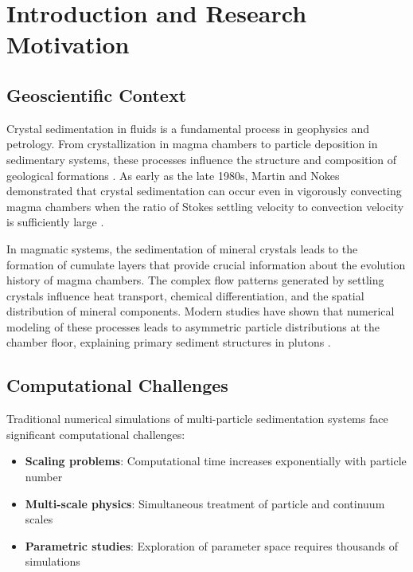 
\chapter{Introduction and Research Motivation}
\label{ch:introduction}

\section{Geoscientific Context}

Crystal sedimentation in fluids is a fundamental process in geophysics and petrology. From crystallization in magma chambers to particle deposition in sedimentary systems, these processes influence the structure and composition of geological formations \parencite{martin1988crystal}. As early as the late 1980s, Martin and Nokes demonstrated that crystal sedimentation can occur even in vigorously convecting magma chambers when the ratio of Stokes settling velocity to convection velocity is sufficiently large \parencite{martin1988crystal,martin1989fluid}.

In magmatic systems, the sedimentation of mineral crystals leads to the formation of cumulate layers that provide crucial information about the evolution history of magma chambers. The complex flow patterns generated by settling crystals influence heat transport, chemical differentiation, and the spatial distribution of mineral components. Modern studies have shown that numerical modeling of these processes leads to asymmetric particle distributions at the chamber floor, explaining primary sediment structures in plutons \parencite{verhoeven2009crystal}.

\section{Computational Challenges}

Traditional numerical simulations of multi-particle sedimentation systems face significant computational challenges:

\begin{itemize}
    \item \textbf{Scaling problems}: Computational time increases exponentially with particle number
    \item \textbf{Multi-scale physics}: Simultaneous treatment of particle and continuum scales
    \item \textbf{Parametric studies}: Exploration of parameter space requires thousands of simulations
\end{itemize}

